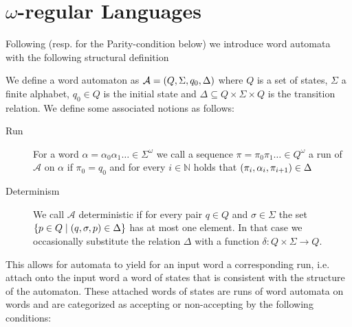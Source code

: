 \section{$\omega$-regular Languages}
\label{sec:wordautomata}
Following \cite{LangAutoLog} (resp. \cite[Chapter 1]{AutoLogInfGames} for the
Parity-condition below) we introduce word automata with the following
structural definition
\begin{definition}
  We define a word automaton as
  $\mathcal{A} = \left(Q, \Sigma, q_{0}, \Delta\right)$ where
  $Q$ is a set of states, $\Sigma$ a finite alphabet, $q_{0}\in Q$ is the
  initial state and $\Delta\subseteq Q\times\Sigma\times Q$ is the transition
  relation. We define some associated notions as follows:
  \begin{description}
    \item [Run]
      For a word $\alpha = \alpha_{0}\alpha_{1}\dots\in\Sigma^{\omega}$ we call
      a sequence $\pi = \pi_{0}\pi_{1}\dots \in Q^{\omega}$ a run of
      $\mathcal{A}$ on $\alpha$ if $\pi_{0} = q_{0}$ and for every
      $i\in\mathbb{N}$ holds that
      $\left(\pi_{i}, \alpha_{i}, \pi_{i+1}\right)\in\Delta$
    \item [Determinism]
      We call $\mathcal{A}$ deterministic if for every pair $q\in Q$ and
      $\sigma\in\Sigma$ the set
      $\left\{p\in Q\mid\left(q,\sigma,p\right)\in\Delta\right\}$ has at most one
      element. In that case we occasionally substitute the relation $\Delta$ 
      with a function $\delta:Q\times\Sigma\rightarrow Q$.
  \end{description}
\end{definition}
This allows for automata to yield for an input word a corresponding run, i.e.
attach onto the input word a word of states that is consistent with the
structure of the automaton. These attached words of states are runs of word
automata on words and are categorized as accepting or non-accepting by the
following conditions:
